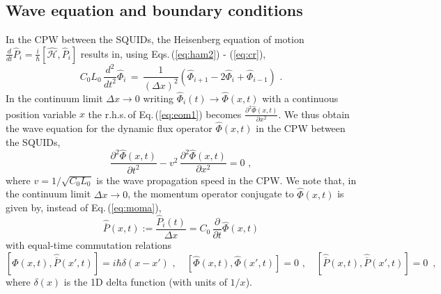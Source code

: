 
\subsection{Wave equation and boundary conditions}  \label{subsec:we}
\noindent
In the CPW between the SQUIDs, the Heisenberg equation of motion 
$\displaystyle \frac{d}{dt} \hat{P}_i = \frac{i}{\hbar} \left[\hat{\mathcal{H}}, \hat{P}_i \right]$ 
results in, using Eqs.\,(\ref{eq:ham2}) - (\ref{eq:cr}), 
%
\begin{equation} \label{eq:eom1}
C_0 L_0 \, \frac{d^2}{dt^2} \hat{\Phi}_i \, = \, 
\frac{1}{(\Delta x)^2} \left(\hat{\Phi}_{i+1} - 2 \hat{\Phi}_i +  \hat{\Phi}_{i-1} \right) \, \, .
\end{equation}
%
In the continuum limit $\Delta x \to 0$ writing $\hat{\Phi}_i(t) \to \hat{\Phi}(x,t)$ 
with a continuous position variable $x$ the r.h.s.\,of Eq.\,(\ref{eq:eom1}) becomes
$\displaystyle \frac{\partial^2\hat{\Phi}(x,t)}{\partial x^2}$. 
We thus obtain the wave equation for the dynamic flux operator
$\hat{\Phi}(x,t)$ in the CPW between the SQUIDs,
%
\begin{equation} \label{eq:eom2}
\frac{\partial^2\hat{\Phi}(x,t)}{\partial t^2} - v^2 \, \frac{\partial^2\hat{\Phi}(x,t)}{\partial x^2} = 0 \, \, ,
\end{equation}
%
where $v = 1 / \sqrt{C_0 L_0}$ is the wave propagation speed in the CPW.
We note that, in the continuum limit $\Delta x \to 0$, 
the momentum operator conjugate to $\hat{\Phi}(x,t)$ is given by,
instead of Eq.\,(\ref{eq:moma}), 
%
\begin{equation} \label{eq:mom2} 
\hat{\overline{P}}(x,t) := \frac{\hat{P}_{i}(t)}{\Delta x} = 
C_0 \, \frac{\partial}{\partial t} \hat{\Phi}(x,t)
\end{equation}
%
with equal-time commutation relations
%
\begin{equation} \label{eq:cr2} 
\left[\hat{\Phi}(x,t), \hat{\overline{P}}(x',t) \right] = i \hbar \delta(x - x') \, \, , \quad 
\left[\hat{\Phi}(x,t), \hat{\Phi}(x',t) \right] = 0 \, \, , \quad 
\left[\hat{\overline{P}}(x,t), \hat{\overline{P}}(x',t) \right] = 0 \, \, \, , 
\end{equation}
%
where $\delta(x)$ is the 1D delta function (with units of $1/x$).

